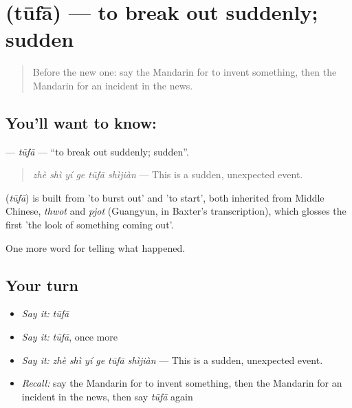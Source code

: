 \section[\texorpdfstring{\zh{突发} (tūfā)}{突发 (tūfā)}]{ (tūfā) — to break out suddenly; sudden}

\label{lesson:ZH-C291-tufa}



\begin{quote}
Before the new one: say the Mandarin for to invent something, then the Mandarin for an incident in the news.
\end{quote}

\subsection*{You'll want to know: }
\textbf{} — \emph{tūfā} — \textquotedblleft{}to break out suddenly; sudden\textquotedblright{}.

\begin{quote}
\emph{zhè shì yí ge tūfā shìjiàn} — This is a sudden, unexpected event.
\end{quote}

\begin{cousinweb}
\textbf{} (\emph{tūfā}) is built from  'to burst out' and  'to start', both inherited from Middle Chinese, \emph{thwot} and \emph{pjot} (Guangyun, in Baxter's transcription), which glosses the first 'the look of something coming out'.
\end{cousinweb}

\begin{grammarlens}[title={What you've built}]
One more word for telling what happened.
\end{grammarlens}

\subsection*{Your turn}
\begin{itemize}
\raggedright
  \item \emph{Say it:} \emph{tūfā}
  \item \emph{Say it:} \emph{tūfā}, once more
  \item \emph{Say it:} \emph{zhè shì yí ge tūfā shìjiàn} — This is a sudden, unexpected event.
  \item \emph{Recall:} say the Mandarin for to invent something, then the Mandarin for an incident in the news, then say \emph{tūfā} again
\end{itemize}

